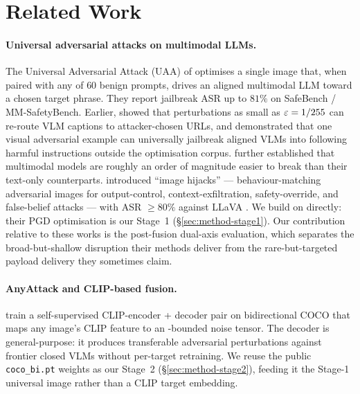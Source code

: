 \section{Related Work}
\label{sec:related}

\paragraph{Universal adversarial attacks on multimodal LLMs.}
The Universal Adversarial Attack (UAA) of \citet{rahmatullaev2025universal} optimises a single image that, when paired with any of $60$ benign prompts, drives an aligned multimodal LLM toward a chosen target phrase. They report jailbreak ASR up to $81\%$ on SafeBench / MM-SafetyBench. Earlier, \citet{schlarmann2023robustness} showed that perturbations as small as $\varepsilon=1/255$ can re-route VLM captions to attacker-chosen URLs, and \citet{qi2024visual} demonstrated that one visual adversarial example can universally jailbreak aligned VLMs into following harmful instructions outside the optimisation corpus. \citet{carlini2024aligned} further established that multimodal models are roughly an order of magnitude easier to break than their text-only counterparts. \citet{bailey2024image} introduced ``image hijacks'' --- behaviour-matching adversarial images for output-control, context-exfiltration, safety-override, and false-belief attacks --- with ASR $\geq 80\%$ against LLaVA \citep{liu2023llava}. We build on \citet{rahmatullaev2025universal} directly: their PGD optimisation is our Stage~1 (\S\ref{sec:method-stage1}). Our contribution relative to these works is the post-fusion dual-axis evaluation, which separates the broad-but-shallow disruption their methods deliver from the rare-but-targeted payload delivery they sometimes claim.

\paragraph{AnyAttack and CLIP-based fusion.}
\citet{zhang2025anyattack} train a self-supervised CLIP-encoder + decoder pair on bidirectional COCO that maps any image's CLIP feature to an \Linf{}-bounded noise tensor. The decoder is general-purpose: it produces transferable adversarial perturbations against frontier closed VLMs without per-target retraining. We reuse the public \texttt{coco\_bi.pt} weights as our Stage~2 (\S\ref{sec:method-stage2}), feeding it the Stage-1 universal image rather than a CLIP target embedding.

